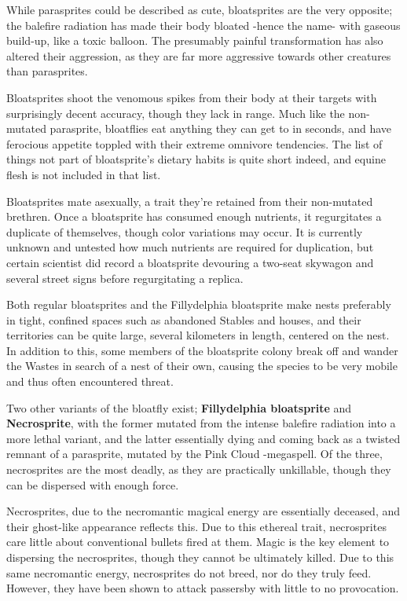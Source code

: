 \documentclass[11pt,a4paper,twocolumn]{book}
\begin{document}
	While parasprites could be described as cute, bloatsprites are the very opposite; the balefire radiation has made their body bloated -hence the name- with gaseous build-up, like a toxic balloon. The presumably painful transformation has also altered their aggression, as they are far more aggressive towards other creatures than parasprites.
	
	Bloatsprites shoot the venomous spikes from their body at their targets with surprisingly decent accuracy, though they lack in range. Much like the non-mutated parasprite, bloatflies eat anything they can get to in seconds, and have ferocious appetite toppled with their extreme omnivore tendencies. The list of things not part of bloatsprite's dietary habits is quite short indeed, and equine flesh is not included in that list.
	
	\bigskip
	Bloatsprites mate asexually, a trait they're retained from their non-mutated brethren. Once a bloatsprite has consumed enough nutrients, it regurgitates a duplicate of themselves, though color variations may occur. It is currently unknown and untested how much nutrients are required for duplication, but certain scientist did record a bloatsprite devouring a two-seat skywagon and several street signs before regurgitating a replica.
	
	Both regular bloatsprites and the Fillydelphia bloatsprite make nests preferably in tight, confined spaces such as abandoned Stables and houses, and their territories can be quite large, several kilometers in length, centered on the nest. In addition to this, some members of the bloatsprite colony break off and wander the Wastes in search of a nest of their own, causing the species to be very mobile and thus often encountered threat.
	
	\bigskip
	Two other variants of the bloatfly exist; \textbf{Fillydelphia bloatsprite} and \textbf{Necrosprite}, with the former mutated from the intense balefire radiation into a more lethal variant, and the latter essentially dying and coming back as a twisted remnant of a parasprite, mutated by the Pink Cloud -megaspell. Of the three, necrosprites are the most deadly, as they are practically unkillable, though they can be dispersed with enough force.
	
	\bigskip
	Necrosprites, due to the necromantic magical energy are essentially deceased, and their ghost-like appearance reflects this. Due to this ethereal trait, necrosprites care little about conventional bullets fired at them. Magic is the key element to dispersing the necrosprites, though they cannot be ultimately killed.
	Due to this same necromantic energy, necrosprites do not breed, nor do they truly feed. However, they have been shown to attack passersby with little to no provocation.
	
\end{document}
